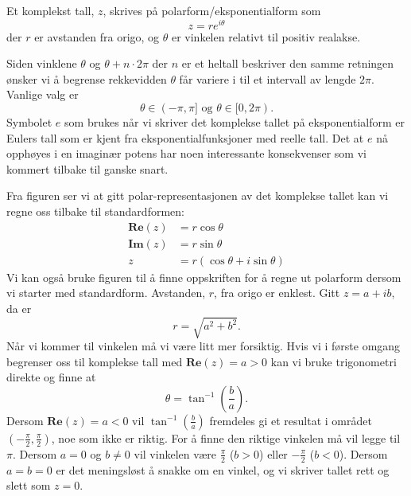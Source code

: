 \documentclass[a4paper,norsk,12pt]{article}
\begin{document}
\begin{tdef}
Et komplekst tall, $z$, skrives på polarform/eksponentialform som
\begin{displaymath}
	z = re^{i\theta}
\end{displaymath}
der $r$ er avstanden fra origo, og $\theta$ er vinkelen relativt til positiv realakse.
\end{tdef}
\noindent
Siden vinklene $\theta$ og $\theta+n\cdot 2\pi$ der $n$ er et heltall beskriver den samme retningen ønsker vi å begrense rekkevidden $\theta$ får variere i til et intervall av lengde $2\pi$. Vanlige valg er
\begin{displaymath}
	\theta \in (-\pi, \pi] \text{ og } \theta \in [0, 2\pi).
\end{displaymath}
Symbolet $e$ som brukes når vi skriver det komplekse tallet på eksponentialform er Eulers tall som er kjent fra eksponentialfunksjoner med reelle tall. Det at $e$ nå opphøyes i en imaginær potens har noen interessante konsekvenser som vi kommert tilbake til ganske snart.

Fra figuren ser vi at gitt polar-representasjonen av det komplekse tallet kan vi regne oss tilbake til standardformen:
\begin{align*}
	\mathbf{Re}(z) &= r\cos\theta \\
	\mathbf{Im}(z) &= r\sin\theta \\
	z &= r(\cos\theta + i\sin\theta)
\end{align*}
Vi kan også bruke figuren til å finne oppskriften for å regne ut polarform dersom vi starter med standardform. Avstanden, $r$, fra origo er enklest. Gitt $z=a + ib$, da er
\begin{displaymath}
	r = \sqrt{a^2 + b^2}.
\end{displaymath}
Når vi kommer til vinkelen må vi være litt mer forsiktig. Hvis vi i første omgang begrenser oss til komplekse tall med $\mathbf{Re}(z)=a>0$ kan vi bruke trigonometri direkte og finne at
\begin{displaymath}
	\theta = \tan^{-1}\left(\frac{b}{a}\right).
\end{displaymath}
Dersom $\mathbf{Re}(z) = a <0$ vil $\tan^{-1}\left(\frac{b}{a}\right)$ fremdeles gi et resultat i området $\left(-\frac{\pi}{2},\frac{\pi}{2}\right)$, noe som ikke er riktig. For å finne den riktige vinkelen må vil legge til $\pi$. Dersom $a=0$ og $b\neq0$ vil vinkelen være $\frac{\pi}{2}$ ($b>0$) eller $-\frac{\pi}{2}$ ($b<0$). Dersom $a=b=0$ er det meningsløst å snakke om en vinkel, og vi skriver tallet rett og slett som $z=0$.
\end{document}
